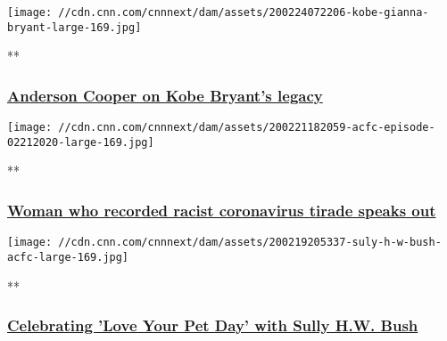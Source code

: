 \href{/videos/us/2020/02/22/kobe-gianna-bryant-memorial-tribute-acfc-full-episode-vpx.cnn/video/playlists/acfc-full-episodes/}{}

\texttt{[image: //cdn.cnn.com/cnnnext/dam/assets/200224072206-kobe-gianna-bryant-large-169.jpg]}

**

\hypertarget{anderson-cooper-on-kobe-bryants-legacy}{%
\subsubsection{\texorpdfstring{\href{/videos/us/2020/02/22/kobe-gianna-bryant-memorial-tribute-acfc-full-episode-vpx.cnn/video/playlists/acfc-full-episodes/}{Anderson
Cooper on Kobe Bryant's
legacy}}{Anderson Cooper on Kobe Bryant's legacy}}\label{anderson-cooper-on-kobe-bryants-legacy}}

\href{/videos/us/2020/02/21/coronavirus-attacks-viral-video-jiraprapasuke-acfc-full-episode-vpx.cnn/video/playlists/acfc-full-episodes/}{}

\texttt{[image: //cdn.cnn.com/cnnnext/dam/assets/200221182059-acfc-episode-02212020-large-169.jpg]}

**

\hypertarget{woman-who-recorded-racist-coronavirus-tirade-speaks-out}{%
\subsubsection{\texorpdfstring{\href{/videos/us/2020/02/21/coronavirus-attacks-viral-video-jiraprapasuke-acfc-full-episode-vpx.cnn/video/playlists/acfc-full-episodes/}{Woman
who recorded racist coronavirus tirade speaks
out}}{Woman who recorded racist coronavirus tirade speaks out}}\label{woman-who-recorded-racist-coronavirus-tirade-speaks-out}}

\href{/videos/us/2020/02/19/sully-h-w-bush-national-love-your-pet-day-full-episode-acfc-vpx.cnn/video/playlists/acfc-full-episodes/}{}

\texttt{[image: //cdn.cnn.com/cnnnext/dam/assets/200219205337-suly-h-w-bush-acfc-large-169.jpg]}

**

\hypertarget{celebrating-love-your-pet-day-with-sully-hw-bush}{%
\subsubsection{\texorpdfstring{\href{/videos/us/2020/02/19/sully-h-w-bush-national-love-your-pet-day-full-episode-acfc-vpx.cnn/video/playlists/acfc-full-episodes/}{Celebrating
'Love Your Pet Day' with Sully H.W.
Bush}}{Celebrating 'Love Your Pet Day' with Sully H.W. Bush}}\label{celebrating-love-your-pet-day-with-sully-hw-bush}}

